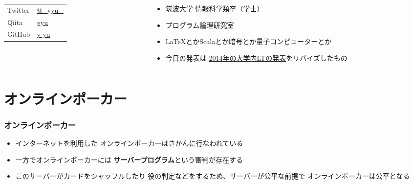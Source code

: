 \begin{frame}
\begin{columns}
\begin{column}{0.4\textwidth}
      \begin{table}[h]
        \begin{tabular}{ll}
          Twitter & \href{https://twitter.com/\_yyu\_}{@\_yyu\_} \\
          Qiita &  \href{https://qiita.com/yyu}{yyu} \\
          GitHub &  \href{https://github.com/y-yu}{y-yu} \\
        \end{tabular}
      \end{table}
    \end{column}
    \begin{column}{0.6\textwidth}
      \pause
      \begin{itemize}
        \item 筑波大学 情報科学類卒（学士）
        \item プログラム論理研究室
        \item<+-> \LaTeX とかScalaとか暗号とか量子コンピューターとか

        \item<+-> 今日の発表は
        \href{https://atnd.org/events/51236}{2014年の大学内LTの発表}をリバイズしたもの
      \end{itemize}
    \end{column}
  \end{columns}
\end{frame}

\section{オンラインポーカー}

\begin{frame}
  \frametitle{オンラインポーカー}

  \pause
  \begin{itemize}
    \item<+-> インターネットを利用した
    オンラインポーカーはさかんに行なわれている

    \item<+-> 一方でオンラインポーカーには
    \textbf{サーバープログラム}という審判が存在する

    \item<+-> このサーバーがカードをシャッフルしたり
    役の判定などをするため、サーバーが公平な前提で
    オンラインポーカーは公平となる
  \end{itemize}
\end{frame}

\begin{frame}

  \pause


\end{frame}

